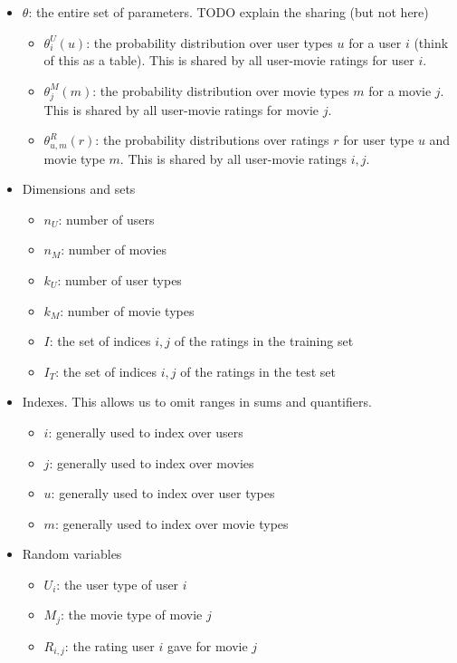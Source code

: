 \documentclass{article}
\begin{document}
\begin{itemize}
\item $\theta$: the entire set of parameters. TODO explain the sharing
  (but not here)
  \begin{itemize}
  \item $\theta^U_i(u)$: the probability distribution over user types
    $u$ for a user $i$ (think
    of this as a table). This is shared by all user-movie ratings for
    user $i$.
  \item $\theta^M_j(m)$: the probability distribution over movie
    types $m$ for a movie $j$. This is shared by all user-movie ratings for movie $j$.
  \item $\theta^R_{u,m}(r)$: the probability distributions over
    ratings $r$ for user type $u$ and movie type $m$. This is shared
    by all user-movie ratings $i,j$.
  \end{itemize}
\item Dimensions and sets
  \begin{itemize}
  \item $n_U$: number of users
  \item $n_M$: number of movies
  \item $k_U$: number of user types
  \item $k_M$: number of movie types
  \item $I$: the set of indices $i,j$ of the ratings in the training
    set
  \item $I_T$: the set of indices $i,j$ of the ratings in the test set
  \end{itemize}
\item Indexes. This allows us to omit ranges in sums and quantifiers.
  \begin{itemize}
  \item $i$: generally used to index over users
  \item $j$: generally used to index over movies
  \item $u$: generally used to index over user types
  \item $m$: generally used to index over movie types
  \end{itemize}
\item Random variables
  \begin{itemize}
  \item $U_i$: the user type of user $i$
  \item $M_j$: the movie type of movie $j$
  \item $R_{i,j}$: the rating user $i$ gave for movie $j$
  \end{itemize}
\end{itemize}

\footnotesize


\end{document}

